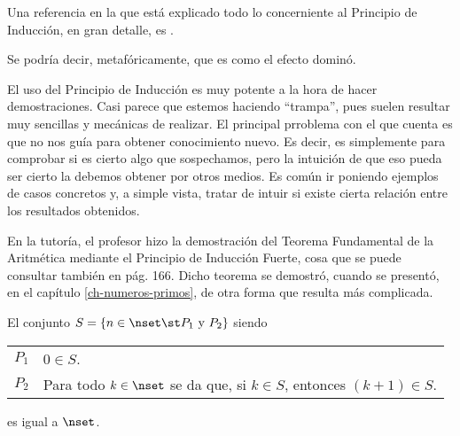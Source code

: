 



Una referencia en la que está explicado todo lo concerniente al Principio de
Inducción, en gran detalle, es \cite{idescent-newstead}.

Se podría decir, metafóricamente, que es como el efecto dominó.

El uso del Principio de Inducción es muy potente a la hora de hacer
demostraciones. Casi parece que estemos haciendo ``trampa'', pues suelen
resultar muy sencillas y mecánicas de realizar. El principal prroblema con
el que cuenta es que no nos guía para obtener conocimiento nuevo. Es decir,
es simplemente para comprobar si es cierto algo que sospechamos, pero la
intuición de que eso pueda ser cierto la debemos obtener por otros medios.
Es común ir poniendo ejemplos de casos concretos y, a simple vista, tratar
de intuir si existe cierta relación entre los resultados obtenidos.



En la tutoría, el profesor hizo la demostración del Teorema Fundamental de
la Aritmética mediante el Principio de Inducción Fuerte, cosa que se puede
consultar también en \cite{proofs-cummings} pág. 166. Dicho teorema se
demostró, cuando se presentó, en el capítulo \ref{ch-numeros-primos}, de
otra forma que resulta más complicada.




\begin{theorem}\label{princ-induccion}
  El conjunto $S = \{n \in \nset \st P_1 \ \text{y} \ P_2\}$ siendo

  \begin{center}
    \begin{tabular}{l p{}}
      $P_1$ & $0 \in S$. \\
      $P_2$ & Para todo $k \in \nset$ se da que, si $k \in S$, entonces
        $(k+1) \in S$.
    \end{tabular}
  \end{center}

  \noindent es igual a $\nset$.
\end{theorem}

